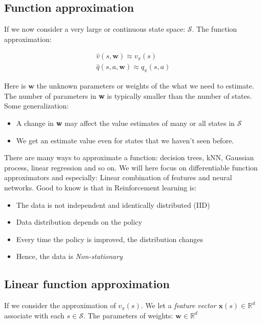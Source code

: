 \subsection*{Function approximation}
If we now consider a very large or continuous state space: $\mathcal{S}$. The function approximation:

	\begin{equation}
	\begin{aligned}
		\hat{v} (s, \textbf{w}) \approx v_\pi(s) \\
		\hat{q} (s,a,\textbf{w}) \approx q_\pi(s,a)
	\end{aligned}
	\end{equation}

Here is $\textbf{w}$ the unknown parameters or weights of the what we need to estimate. The number of parameters in \textbf{w} is typically smaller than the number of states. Some generalization:
	\begin{itemize}
		\item A change in \textbf{w} may affect the value estimates of many or all states in $\mathcal{S}$
		\item We get an estimate value even for states that we haven't seen before.
	\end{itemize}

There are many ways to approximate a function: decision trees, kNN, Gaussian process, linear regression and so on. We will here focus on differentiable function approximators and especially: Linear combination of features and neural networks. Good to know is that in Reinforcement learning is:

	\begin{itemize}
		\item The data is not independent and identically distributed (IID)
		\item Data distribution depends on the policy
		\item Every time the policy is improved, the distribution changes
		\item Hence, the data is \emph{Non-stationary}
	\end{itemize}

\subsection*{Linear function approximation}
If we consider the approximation of $v_\pi(s)$. We let a \emph{feature vector} $\textbf{x}(s) \in \mathbb{R}^{d}$  associate with each $s \in \mathcal{S}$. The parameters of weights: $\textbf{w} \in \mathbb{R}^{d}$

